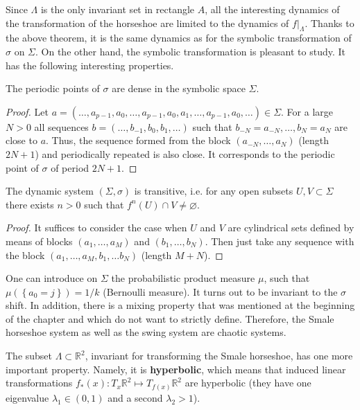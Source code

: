Since $\Lambda $ is the only invariant set in rectangle $A$, all the interesting dynamics of the transformation of the horseshoe are limited to the dynamics of $f|_{\Lambda }$. Thanks to the above theorem, it is the same dynamics as for the symbolic transformation of $\sigma $ on $\Sigma$. On the other hand, the symbolic transformation is pleasant to study. It has the following interesting properties.

\begin{proposition}
	The periodic points of $\sigma $ are dense in the symbolic space $\Sigma $.
	\begin{proof}
		Let $a=\left( \ldots, a_{p-1}, a_{0},\ldots, a_{p-1}, a_{0}, a_{1}, \ldots, a_{p-1}, a_{0}, \ldots\right) \in \Sigma $. For a large $N> 0$ all sequences $b=\left(\ldots ,b_{-1},b_{0},b_{1},\ldots \right) $ such that $b_{-N}=a_{-N},\ldots ,b_{N}=a_{N}$ are close to $a$. Thus, the sequence formed from the block $\left( a_{-N},\ldots ,a_{N}\right) $ (length $2N + 1$) and periodically repeated is also close. It corresponds to the periodic point of $\sigma$ of period $2N + 1$.
	\end{proof}
\end{proposition}

\begin{proposition}
	The dynamic system $\left( \Sigma, \sigma \right) $ is transitive, i.e. for any open subsets $U,V\subset \Sigma $ there exists $n>0$ such that $f^{n}(U)\cap V\not=\varnothing.$
	\begin{proof}
		It suffices to consider the case when $U$ and $V$ are cylindrical sets defined by means of blocks $\left(
		a_{1},\ldots ,a_{M}\right) $ and $\left( b_{1},\ldots ,b_{N}\right)$. Then just take any sequence with the block $\left( a_{1},\ldots, a_{M},b_{1},\ldots b_{N}\right) $ (length $M + N$).
	\end{proof}
\end{proposition}

\begin{remark}
	One can introduce on $\Sigma$ the probabilistic product measure $\mu$, such that $\mu \left( \left\{ a_{0}=j\right\} \right) =1/k$ (Bernoulli measure). It turns out to be invariant to the $\sigma$ shift. In addition, there is a mixing property that was mentioned at the beginning of the chapter and which do not want to strictly define. Therefore, the Smale horseshoe system as well as the swing system are chaotic systems.
\end{remark}

The subset $\Lambda \subset \mathbb{R}^{2}$, invariant for transforming the Smale horseshoe, has one more important property. Namely, it is \textbf{hyperbolic}, which means that induced linear transformations $f_{\ast }(x):T_{x}\mathbb{R}^{2}\longmapsto
T_{f(x)}\mathbb{R}^{2}$ are hyperbolic (they have one eigenvalue $\lambda _{1}\in \left( 0,1\right) $ and a second $\lambda _{2}>1$).

